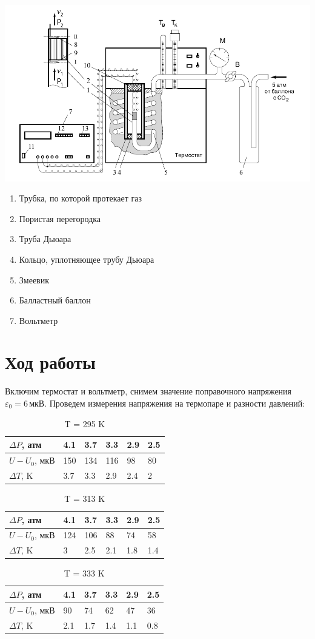 \documentclass[a4paper,12pt]{article}
\newcommand{\eps}{\varepsilon}
\begin{document}
	\includegraphics[width = 0.6\linewidth]{instrument}
	
	\begin{enumerate}
		\item Трубка, по которой протекает газ
		\item Пористая перегородка
		\item Труба Дьюара
		\item Кольцо, уплотняющее трубу Дьюара
		\item Змеевик
		\item Балластный баллон
		\item Вольтметр
	\end{enumerate}
	
	\section{Ход работы}
	Включим термостат и вольтметр, снимем значение поправочного напряжения $\eps_0 = 6\,\text{мкВ}$.
	Проведем измерения напряжения на термопаре и  разности давлений:\newline
	

\begin{table}[H]
	\caption{T = 295 K }
	\centering
	\begin{tabular}{  l |  l  l  l  l  l }
		$\Delta P$, атм & 4.1 & 3.7 & 3.3 & 2.9 & 2.5 \\ \hline
		$U-U_0$, мкВ    & 150 & 134 & 116 & 98  & 80 \\ \hline
		$\Delta T$, K   & 3.7 & 3.3 & 2.9 & 2.4 & 2 \\ \hline
	\end{tabular}
\end{table}
\begin{table}[H]
	\caption{T = 313 K }
	\centering
	\begin{tabular}{  l |  l  l  l  l  l }
		$\Delta P$, атм & 4.1 & 3.7 & 3.3 & 2.9 & 2.5 \\ \hline
		$U-U_0$, мкВ    & 124 & 106 & 88 & 74  & 58 \\ \hline
		$\Delta T$, K   & 3   & 2.5 & 2.1 & 1.8 & 1.4 \\ \hline
	\end{tabular}
\end{table}
\begin{table}[H]
	\caption{T = 333 K }
	\centering
	\begin{tabular}{  l |  l  l  l  l  l }
		$\Delta P$, атм & 4.1 & 3.7 & 3.3 & 2.9 & 2.5 \\ \hline
		$U-U_0$, мкВ    & 90 & 74 & 62 & 47  & 36 \\ \hline
		$\Delta T$, K   & 2.1& 1.7 & 1.4 & 1.1 & 0.8 \\ \hline
	\end{tabular}
\end{table}
\end{document}

